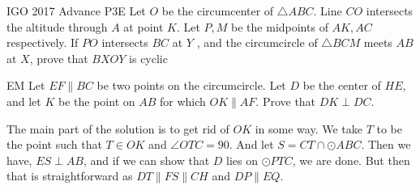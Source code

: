 \newpage
{}
{IGO 2017 Advance P3}{E}{
    Let $O$ be the circumcenter of $\triangle ABC$. Line $CO$ intersects the
    altitude through $A$ at point $K$. Let $P, M$ be the midpoints of $AK, AC$
    respectively. If $PO$ intersects $BC$ at $Y$ , and the circumcircle of
    $\triangle BCM$ meets $AB$ at $X$, prove that $BXOY$ is cyclic
}
\begin{minipage}{.5\linewidth}
\end{minipage}\hfill%
\begin{minipage}{.49\linewidth}
\end{minipage}



\begin{minipage}{.5\linewidth}
    \prob{}
    {}{EM}{
        Let $EF\parallel BC$ be two points on the circumcircle. Let $D$ be the center of
        $HE$, and let $K$ be the point on $AB$ for which $OK\parallel AF$. Prove that
        $DK\perp DC$.
    }

    \begin{solution}
        The main part of the solution is to get rid of $OK$ in some way. We take
        $T$ to be the point such that $T\in OK$ and $\angle OTC = 90$. And let $S
        = CT\cap \odot ABC$. Then we have, $ES\perp AB$, and if we can show that
        $D$ lies on $\odot PTC$, we are done. But then that is straightforward as
        $DT\parallel FS\parallel CH$ and $DP\parallel EQ$.
    \end{solution}
\end{minipage}\hfill%
\begin{minipage}{.48\linewidth}
\end{minipage}


\newpage
{}

